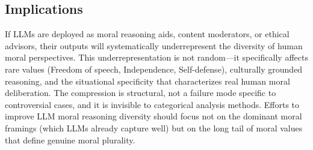 \documentclass[11pt,a4paper]{article}
\begin{document}
\subsection{Implications}

If LLMs are deployed as moral reasoning aids, content moderators, or ethical advisors, their outputs will systematically underrepresent the diversity of human moral perspectives. This underrepresentation is not random---it specifically affects rare values (Freedom of speech, Independence, Self-defense), culturally grounded reasoning, and the situational specificity that characterizes real human moral deliberation. The compression is structural, not a failure mode specific to controversial cases, and it is invisible to categorical analysis methods. Efforts to improve LLM moral reasoning diversity should focus not on the dominant moral framings (which LLMs already capture well) but on the long tail of moral values that define genuine moral plurality.
\end{document}
